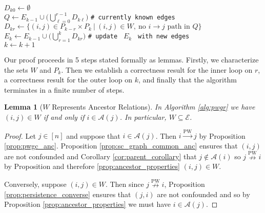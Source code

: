 \documentclass{statsoc}
\newcounter{lemma}
\def\pwgc{\overset{\text{PW}}{\rightarrow}}  %
\def\npwgc{\overset{\text{PW}}{\nrightarrow}}  %
\def\gcge{\mathcal{E}}  %
\newcommand{\anc}[1]{\mathcal{A}(#1)}  %
\newtheorem{lemma}{Lemma}
\begin{document}
\begin{algorithm}[H]
{    $D_{k0} \leftarrow \emptyset$\\
    {
      $Q \leftarrow E_{k - 1} \cup \big(\bigcup_{\ell = 0}^{r - 1} D_{k\ell}\big)$ \texttt{\# currently known edges}\\
      $D_{kr} \leftarrow \{(i, j) \in P_{k - r} \times P_k\ |\ (i, j) \in W,\ \text{no } i \rightarrow j \text{ path in } Q\}$
    }
    $E_k \leftarrow E_{k - 1} \cup \big(\bigcup_{r = 1}^k D_{kr}\big)$ \texttt{\# update } $E_k$ \texttt{ with new edges}\\
    $k \leftarrow k + 1$
  }
\end{algorithm}

Our proof proceeds in 5 steps stated formally as lemmas.  Firstly, we
characterize the sets $W$ and $P_k$.  Then we establish a correctness
result for the inner loop on $r$, a correctness result for the outer
loop on $k$, and finally that the algorithm terminates in a finite
number of steps.

\begin{lemma}[$W$ Represents Ancestor Relations]
  \label{lem:W_subset_E}
  In Algorithm \ref{alg:pwgr} we have
  $(i, j) \in W$ if and only if $i \in \anc{j}$.  In particular,
  $W \subseteq \gcge$.
\end{lemma}
\begin{proof}
  Let $j \in [n]$ and suppose that $i \in \anc{j}$.  Then $i \pwgc j$
  by Proposition \ref{prop:pwgc_anc}.  Proposition
  \ref{prop:sc_graph_common_anc} ensures that $(i, j)$ are not
  confounded and Corollary \ref{cor:parent_corollary} that
  $j \not\in \anc{i}$ so $j \npwgc i$ by Proposition and therefore
  \ref{prop:ancestor_properties} $(i, j) \in W$.

  Conversely, suppose $(i, j) \in W$.  Then since $j \npwgc i$,
  Proposition \ref{prop:persistence_converse} ensures that $(j, i)$
  are not confounded and so by Proposition \ref{prop:ancestor_properties}
  we must have $i \in \anc{j}$.
\end{proof}
\end{document}

